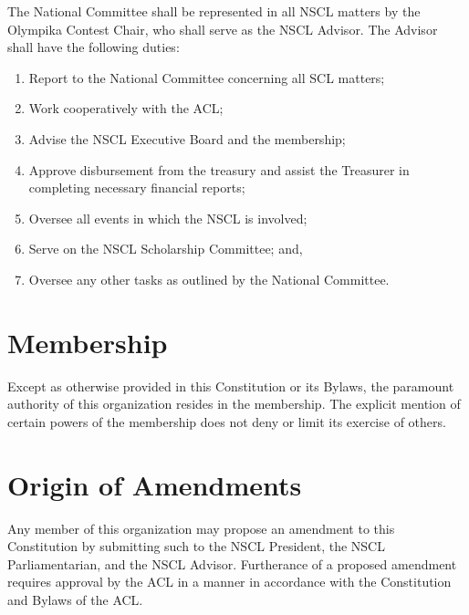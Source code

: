 \documentclass{bylaws_nofont}
\newcommand{\NSCL}{\textsc{NSCL}\xspace}
\newcommand{\SCL}{\textsc{SCL}\xspace}
\newcommand{\ACL}{\textsc{ACL}\xspace}
\begin{document}
\begin{linenumbers}[1]
\begin{enumerate}
    \sub[\NSCL Advisor] The National Committee shall be represented in
    all \NSCL matters by the Olympika Contest Chair, who shall serve as
    the \NSCL Advisor. The Advisor shall have the following duties:
    \begin{enumerate}
    \item Report to the National Committee concerning all \SCL matters;
    \item Work cooperatively with the \ACL;
    \item Advise the \NSCL Executive Board and the membership;
    \item Approve disbursement from the treasury and assist the
      Treasurer in completing necessary financial reports;
    \item Oversee all events in which the \NSCL is involved;
    \item Serve on the \NSCL Scholarship Committee; and,
    \item Oversee any other tasks as outlined by the National Committee.\\
    \end{enumerate}
  \end{enumerate}

  \section{Membership}
  Except as otherwise provided in this Constitution or its Bylaws, the
  paramount authority of this organization resides in the
  membership. The explicit mention of certain powers of the membership
  does not deny or limit its exercise of others.\\


  \section{Origin of Amendments}
  Any member of this organization may propose an amendment to this
  Constitution by submitting such to the \NSCL President, the \NSCL
  Parliamentarian, and the \NSCL Advisor. Furtherance of a proposed
  amendment requires approval by the \ACL in a manner in accordance with
  the Constitution and Bylaws of the \ACL.\\


\end{linenumbers}
\end{document}
